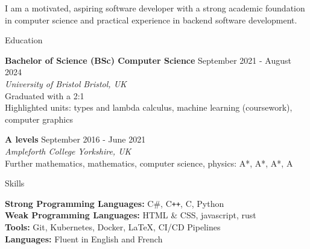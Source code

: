 \documentclass{resume} %
\begin{document}


I am a motivated, aspiring software developer with a strong academic foundation in computer science and practical experience in backend software development.



\begin{rSection}{Education}

{\bf Bachelor of Science (BSc) Computer Science} \hfill {September 2021 - August 2024} \\
\textit{University of Bristol} \hfill \textit{Bristol, UK} \\
Graduated with a 2:1 \\
Highlighted units: types and lambda calculus, machine learning (coursework), computer graphics

{\bf A levels} \hfill {September 2016 - June 2021} \\
\textit{Ampleforth College} \hfill \textit{Yorkshire, UK} \\
Further mathematics, mathematics, computer science, physics: A*, A*, A*, A

\end{rSection}


\begin{rSection}{Skills}

{\bf Strong Programming Languages:} C\#, C\texttt{++}, C, Python\\
{\bf Weak Programming Languages:} HTML \& CSS, javascript, rust \\
{\bf Tools:} Git, Kubernetes, Docker, LaTeX, CI/CD Pipelines \\
{\bf Languages:} Fluent in English and French

\end{rSection}

\end{document}
